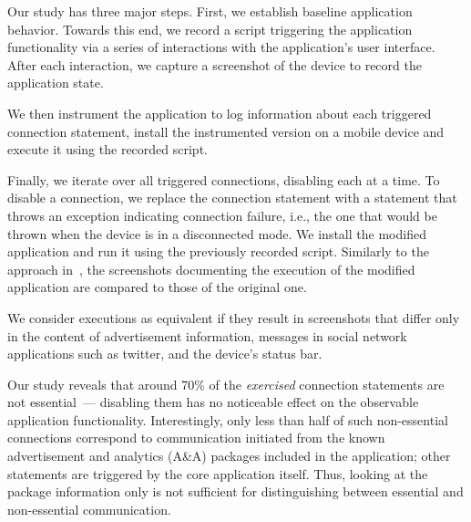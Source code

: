 Our study has three major steps. First, we establish baseline
application behavior.  Towards this end, we record a
script triggering the application functionality via a series of
interactions with the application's user interface.  After each
interaction, we capture a screenshot of the device to record the
application state.

We then instrument the application to log information
about each triggered connection statement, install the instrumented version on a mobile device and execute it using the recorded script.

Finally, we iterate over all triggered connections, disabling each at a time.
To disable a connection, we replace the connection statement  
with a statement that throws an exception indicating connection failure, 
i.e., the one that would be thrown when the device is in a disconnected mode. 
%
We install the modified
application and run it using the previously recorded script. 
Similarly to the approach
in~\cite{Hornyack:Han:Jung:Schechter:Wetherall:CCS11}, the
screenshots documenting the execution of the modified application are
compared to those of the original one. 

We consider executions as
equivalent if they result in screenshots that differ only in the
content of advertisement information, messages in social network
applications such as twitter, and the device's status bar.  

Our study reveals that around 70\% of
the \emph{exercised} connection statements are not essential~--- disabling
them has no noticeable effect on the observable application
functionality. Interestingly, only less than half of such non-essential connections correspond to communication initiated from the known advertisement and analytics (A\&A) packages included in the application; other statements are triggered by the core application itself. 
Thus, looking at the package information only is not sufficient for distinguishing between
essential and non-essential communication. 


